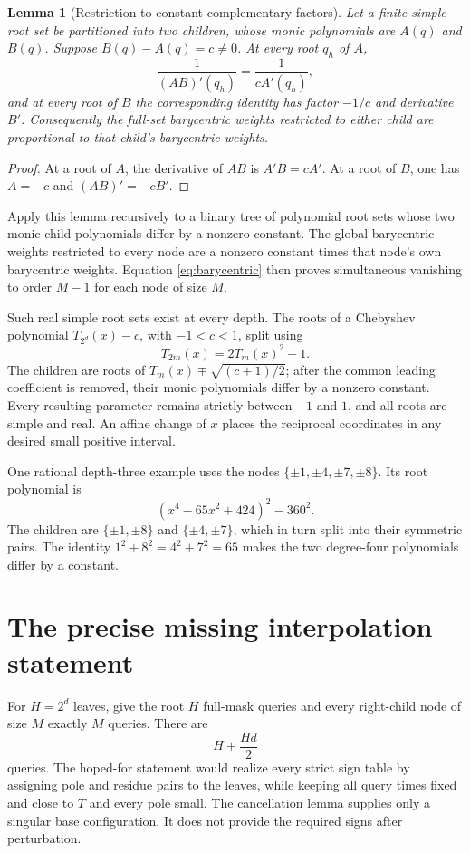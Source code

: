 \documentclass[11pt]{article}
\newtheorem{lemma}{Lemma}
\begin{document}
\begin{lemma}[Restriction to constant complementary factors]
Let a finite simple root set be partitioned into two children,
whose monic polynomials are $A(q)$ and $B(q)$. Suppose
$B(q)-A(q)=c\ne0$. At every root $q_h$ of $A$,
\[
 \frac1{(AB)'(q_h)}=\frac1{c A'(q_h)},
\]
and at every root of $B$ the corresponding identity has factor
$-1/c$ and derivative $B'$. Consequently the full-set barycentric
weights restricted to either child are proportional to that child's
barycentric weights.
\end{lemma}
\begin{proof}
At a root of $A$, the derivative of $AB$ is $A'B=cA'$.
At a root of $B$, one has $A=-c$ and $(AB)'=-cB'$.
\end{proof}

Apply this lemma recursively to a binary tree of polynomial root
sets whose two monic child polynomials differ by a nonzero constant.
The global barycentric weights restricted to every node are a
nonzero constant times that node's own barycentric weights. Equation
\eqref{eq:barycentric} then proves simultaneous vanishing to order
$M-1$ for each node of size $M$.

Such real simple root sets exist at every depth. The roots of a
Chebyshev polynomial $T_{2^d}(x)-c$, with $-1<c<1$, split using
\[
 T_{2m}(x)=2T_m(x)^2-1.
\]
The children are roots of
$T_m(x)\mp\sqrt{(c+1)/2}$; after the common leading coefficient
is removed, their monic polynomials differ by a nonzero constant.
Every resulting parameter remains strictly between $-1$ and $1$,
and all roots are simple and real. An affine change of $x$ places
the reciprocal coordinates in any desired small positive interval.

One rational depth-three example uses the nodes
$\{\pm1,\pm4,\pm7,\pm8\}$. Its root polynomial is
\[
 (x^4-65x^2+424)^2-360^2.
\]
The children are $\{\pm1,\pm8\}$ and $\{\pm4,\pm7\}$,
which in turn split into their symmetric pairs. The identity
$1^2+8^2=4^2+7^2=65$ makes the two degree-four polynomials
differ by a constant.

\section{The precise missing interpolation statement}
For $H=2^d$ leaves, give the root $H$ full-mask queries and every
right-child node of size $M$ exactly $M$ queries. There are
\[
 H+\frac{Hd}{2}
\]
queries. The hoped-for statement would realize every strict sign
table by assigning pole and residue pairs to the leaves, while
keeping all query times fixed and close to $T$ and every pole small.
The cancellation lemma supplies only a singular base configuration.
It does not provide the required signs after perturbation.
\end{document}
